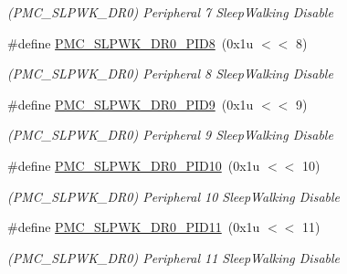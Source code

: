 \begin{DoxyCompactItemize}
\begin{DoxyCompactList}\small\item\em (P\+M\+C\+\_\+\+S\+L\+P\+W\+K\+\_\+\+D\+R0) Peripheral 7 Sleep\+Walking Disable \end{DoxyCompactList}\item 
\mbox{\label{group__SAMV71__PMC_ga67953823b700e33d87338bf8a352e4fc}} 
\#define \mbox{\hyperlink{group__SAMV71__PMC_ga67953823b700e33d87338bf8a352e4fc}{P\+M\+C\+\_\+\+S\+L\+P\+W\+K\+\_\+\+D\+R0\+\_\+\+P\+I\+D8}}~(0x1u $<$$<$ 8)
\begin{DoxyCompactList}\small\item\em (P\+M\+C\+\_\+\+S\+L\+P\+W\+K\+\_\+\+D\+R0) Peripheral 8 Sleep\+Walking Disable \end{DoxyCompactList}\item 
\mbox{\label{group__SAMV71__PMC_ga948db235629c0041ccb47c795aa37ffc}} 
\#define \mbox{\hyperlink{group__SAMV71__PMC_ga948db235629c0041ccb47c795aa37ffc}{P\+M\+C\+\_\+\+S\+L\+P\+W\+K\+\_\+\+D\+R0\+\_\+\+P\+I\+D9}}~(0x1u $<$$<$ 9)
\begin{DoxyCompactList}\small\item\em (P\+M\+C\+\_\+\+S\+L\+P\+W\+K\+\_\+\+D\+R0) Peripheral 9 Sleep\+Walking Disable \end{DoxyCompactList}\item 
\mbox{\label{group__SAMV71__PMC_gaf464ad11065a7306faad9bd70430b4ea}} 
\#define \mbox{\hyperlink{group__SAMV71__PMC_gaf464ad11065a7306faad9bd70430b4ea}{P\+M\+C\+\_\+\+S\+L\+P\+W\+K\+\_\+\+D\+R0\+\_\+\+P\+I\+D10}}~(0x1u $<$$<$ 10)
\begin{DoxyCompactList}\small\item\em (P\+M\+C\+\_\+\+S\+L\+P\+W\+K\+\_\+\+D\+R0) Peripheral 10 Sleep\+Walking Disable \end{DoxyCompactList}\item 
\mbox{\label{group__SAMV71__PMC_ga07869d56d5406e7d90408c1a23aa5e6c}} 
\#define \mbox{\hyperlink{group__SAMV71__PMC_ga07869d56d5406e7d90408c1a23aa5e6c}{P\+M\+C\+\_\+\+S\+L\+P\+W\+K\+\_\+\+D\+R0\+\_\+\+P\+I\+D11}}~(0x1u $<$$<$ 11)
\begin{DoxyCompactList}\small\item\em (P\+M\+C\+\_\+\+S\+L\+P\+W\+K\+\_\+\+D\+R0) Peripheral 11 Sleep\+Walking Disable \end{DoxyCompactList}\item 

\end{DoxyCompactItemize}
